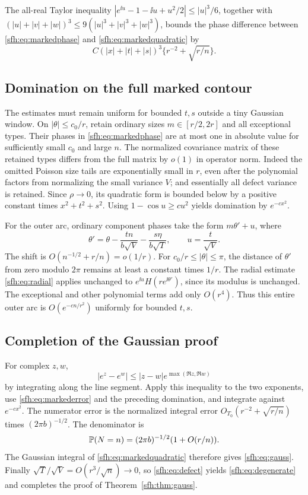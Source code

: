 The all-real Taylor inequality
$|e^{\ii u}-1-\ii u+u^2/2|\le|u|^3/6$, together with
$(|u|+|v|+|w|)^3\le9(|u|^3+|v|^3+|w|^3)$, bounds the phase difference between \eqref{sfh:eq:markedphase} and \eqref{sfh:eq:markedquadratic} by
\begin{equation}\label{sfh:eq:markederror}
 C(|x|+|t|+|s|)^3\{r^{-2}+\sqrt{r/n}\}.
\end{equation}

\subsection{Domination on the full marked contour}
The estimates must remain uniform for bounded $t,s$ outside a tiny Gaussian window. On $|\theta|\le c_0/r$, retain ordinary sizes $m\in[r/2,2r]$ and all exceptional types. Their phases in \eqref{sfh:eq:markedphase} are at most one in absolute value for sufficiently small $c_0$ and large $n$. The normalized covariance matrix of these retained types differs from the full matrix by $o(1)$ in operator norm. Indeed the omitted Poisson size tails are exponentially small in $r$, even after the polynomial factors from normalizing the small variance $V$; and essentially all defect variance is retained. Since $\rho\to0$, its quadratic form is bounded below by a positive constant times $x^2+t^2+s^2$. Using $1-\cos u\ge cu^2$ yields domination by $e^{-cx^2}$.

For the outer arc, ordinary component phases take the form $m\theta'+u$, where
\[
 \theta'=\theta-\frac{tn}{b\sqrt V}-\frac{s\eta}{b\sqrt T},
 \qquad u=\frac t{\sqrt V}.
\]
The shift is $O(n^{-1/2}+r/n)=o(1/r)$. For $c_0/r\le|\theta|\le\pi$, the distance of $\theta'$ from zero modulo $2\pi$ remains at least a constant times $1/r$. The radial estimate \eqref{sfh:eq:radial} applies unchanged to $e^{\ii u}H(re^{\ii\theta'})$, since its modulus is unchanged. The exceptional and other polynomial terms add only $O(r^4)$. Thus this entire outer arc is $O(e^{-cn/r^2})$ uniformly for bounded $t,s$.

\subsection{Completion of the Gaussian proof}
For complex $z,w$,
\[
 |e^z-e^w|\le|z-w|e^{\max(\Re z,\Re w)}
\]
by integrating along the line segment. Apply this inequality to the two exponents, use \eqref{sfh:eq:markederror} and the preceding domination, and integrate against $e^{-cx^2}$. The numerator error is the normalized integral error $O_{T_0}(r^{-2}+\sqrt{r/n})$ times $(2\pi b)^{-1/2}$. The denominator is
\[
 \mathbb P(N=n)=(2\pi b)^{-1/2}(1+O(r/n)).
\]
The Gaussian integral of \eqref{sfh:eq:markedquadratic} therefore gives \eqref{sfh:eq:gauss}. Finally $\sqrt T/\sqrt V=O(r^3/\sqrt n)\to0$, so \eqref{sfh:eq:defect} yields \eqref{sfh:eq:degenerate} and completes the proof of Theorem~\ref{sfh:thm:gauss}.
